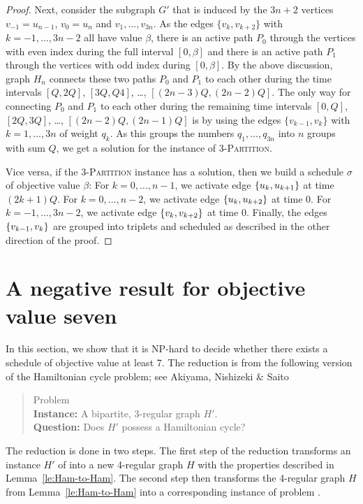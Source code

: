 \begin{proof}
Next, consider the subgraph $G'$ that is induced by the $3n+2$ vertices $v_{-1}=u_{n-1}$, $v_0=u_n$ and 
$v_1,\ldots,v_{3n}$.
As the edges $\{v_k, v_{k+2}\}$ with $k=-1,\ldots,3n-2$ all have value $\beta$, there is an active path $P_0$ 
through the vertices with even index during the full interval $[0,\beta]$ and there is an active 
path $P_1$ through the vertices with odd index during $[0, \beta]$.
By the above discussion, graph $H_n$ connects these two paths $P_0$ and $P_1$ to each other during the
time intervals $[Q,2Q]$, $[3Q,Q4]$, \dots, $[(2n-3)Q,(2n-2)Q]$.
The only way for connecting $P_0$ and $P_1$ to each other during the remaining time intervals 
$[0,Q]$, $[2Q,3Q]$, \dots, $[(2n-2)Q,(2n-1)Q]$ is by using the edges $\{v_{k-1},v_k\}$ with $k=1,\ldots,3n$ of 
weight $q_k$.
As this groups the numbers $q_1,\ldots,q_{3n}$ into $n$ groups with sum $Q$, we get a solution
for the instance of \textsc{3-Partition}.

Vice versa, if the \textsc{3-Partition} instance has a solution, then we  build a schedule $\sigma$
of objective value $\beta$: For $k=0,\ldots,n-1$, we activate edge $\{ u_k, u_{k+1} \}$ at time $(2k+1)Q$. For $k=0,\ldots,n-2$, we activate edge $\{ u_k, u_{k+2} \}$ at time $0$. For $k=-1,\ldots,3n-2$, we activate edge $\{ v_k, v_{k+2} \}$ at time $0$. Finally, the edges $\{ v_{k-1},v_k \}$ are grouped into triplets and scheduled as described in the other direction of the proof.
\end{proof}


\section{A negative result for objective value seven}
\label{sec:value-seven}
In this section, we show that it is NP-hard to decide whether there exists a schedule of objective value at least 7. 
The reduction is from the following version of the Hamiltonian cycle problem; 
see Akiyama, Nishizeki \& Saito \cite{hamilton3regularBip}
\begin{quote}
Problem {\xxxHAM}
\\
\textbf{Instance:} A bipartite, 3-regular graph $H'$.  
\\
\textbf{Question:} Does $H'$ possess a Hamiltonian cycle? 
\end{quote}
The reduction is done in two steps.
The first step of the reduction transforms an instance $H'$ of {\xxxHAM} into a new 4-regular graph $H$ 
with the properties described in Lemma~\ref{le:Ham-to-Ham}.
The second step then transforms the 4-regular graph $H$ from Lemma~\ref{le:Ham-to-Ham}
into a corresponding instance of problem {\xxxNTP}.

